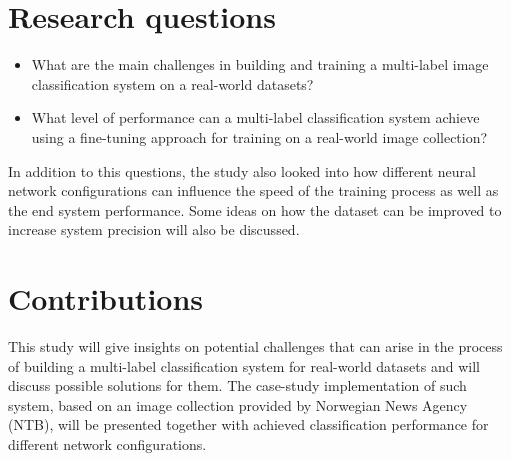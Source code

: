 \section{Research questions}

\begin{itemize}
    \item What are the main challenges in building and training a multi-label image classification system on a real-world datasets?
    \item What level of performance can a multi-label classification system achieve using a fine-tuning approach for training on a real-world image collection?
\end{itemize}

In addition to this questions, the study also looked into how different neural network configurations can influence the speed of the training process as well as the end system performance. Some ideas on how the dataset can be improved to increase system precision will also be discussed.

\section{Contributions}
    This study will give insights on potential challenges that can arise in the process of building a multi-label classification system for real-world datasets and will discuss possible solutions for them. The case-study implementation of such system, based on an image collection provided by Norwegian News Agency (NTB), will be presented together with achieved classification performance for different network configurations.
    
